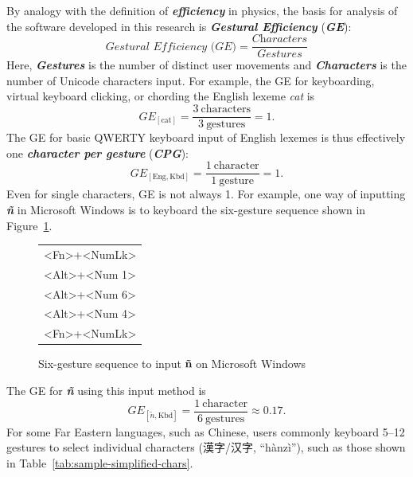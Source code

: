By analogy with the definition of \emph{\textbf{efficiency}} in physics,
the basis for analysis of the software developed in this research is
\emph{\textbf{Gestural Efficiency}} (\emph{\textbf{GE}}):
\[
\textit{Gestural Efficiency (GE)} = \frac{\textit{Characters}}{\textit{Gestures}}
\]
Here, \emph{\textbf{Gestures}} is the number of distinct user
movements and \emph{\textbf{Characters}} is the number of Unicode
characters input. For example, the GE for keyboarding, virtual keyboard
clicking, or chording the English lexeme \textit{cat} is
\[
GE_{[\text{cat}]} = \frac{3\ \text{characters}}{3\ \text{gestures}} = 1.
\]
The GE for basic QWERTY keyboard input of English lexemes is thus
effectively one \emph{\textbf{character per gesture}} (\emph{\textbf{CPG}}):
\[
GE_{[\text{Eng},\text{Kbd}]} = \frac{1\ \text{character}}{1\ \text{gesture}} = 1.
\]
Even for single characters, GE is not always 1. For example, one way of
inputting \emph{\textbf{ñ}} in Microsoft Windows is to keyboard the
six-gesture sequence shown in
Figure~\ref{fig:six-gesture-sequence-n-tilde}.

\begin{figure}[H]
	\centering

	\begin{singlespace*} %
		\ttfamily
		\begin{tabular}{l}
			\textless Fn\textgreater{}+\textless NumLk\textgreater{} \\
			\textless Alt\textgreater{}+\textless Num 1\textgreater{} \\
			\textless Alt\textgreater{}+\textless Num 6\textgreater{} \\
			\textless Alt\textgreater{}+\textless Num 4\textgreater{} \\
			\textless Fn\textgreater{}+\textless NumLk\textgreater{}
		\end{tabular}
	\end{singlespace*}

	\caption{Six-gesture sequence to input \textbf{ñ} on Microsoft Windows}
	\label{fig:six-gesture-sequence-n-tilde}
\end{figure}


The GE for \emph{\textbf{ñ}} using this input method is
\[
GE_{[\tilde{n},\text{Kbd}]} =
\frac{1\ \text{character}}{6\ \text{gestures}} \approx 0.17.
\]
For some Far Eastern languages, such as Chinese, users commonly
keyboard 5–12 gestures to select individual characters
(漢字/汉字, “hànzì”), such as those shown in
Table~\ref{tab:sample-simplified-chars}.

